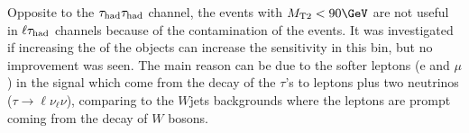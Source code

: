 Opposite to the $\tau_{\rm had}\tau_{\rm had}$ channel, the events with $\mttwo<90 \GeV$ are not useful in $\ell\tau_{\rm had}$ channels because of the contamination of 
the \wjets events. It was investigated if increasing the \pt of the objects can increase the sensitivity in this bin, but no improvement was seen.
The main reason can be due to the softer leptons (e and $\mu$) in the signal which come from the decay of the $\tau$'s 
to leptons plus two neutrinos ($\tau\rightarrow\ell\nu_{\ell}\nu$), 
comparing to the $W$jets backgrounds where the leptons are prompt coming from the decay of $W$ bosons.
